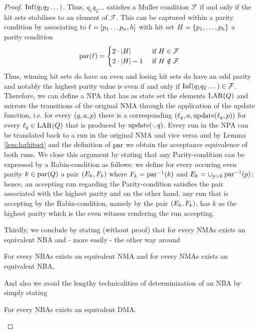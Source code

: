 \begin{proof}
  $\operatorname{Inf}(q_{1}q_{2}\dots)$. Thus, $q_{1}q_{2}\dots$ satisfies a Muller condition
  $\mathcal{F}$ if and only if the hit sets stabilises to an element of
  $\mathcal{F}$. This can be captured within a parity condition by associating
  to $\ell = \left[p_{1}\dots p_{n},h\right]$ with hit set
  $H = \left\{p_{1},\dots,p_{h}\right\}$ a parity condition
  \begin{equation*}
    \operatorname{par}(\ell) = \begin{cases}
      2\cdot\left\vert{H}\right\vert &\text{ if }H\in\mathcal{F}\\
      2\cdot\left\vert{H}\right\vert-1 &\text{ if }H\notin\mathcal{F}
    \end{cases}
  \end{equation*}
  Thus, winning hit sets do have an even and losing hit sets do have an odd
  parity and notably the highest parity value is even if and only if
  $\operatorname{Inf}(q_{1}q_{2}\dots)\in\mathcal{F}$. Therefore, we can define a \ac{NPA}
  that has as state set the elements $\operatorname{LAR}(Q)$ and mirrors the transitions of
  the original \ac{NMA} through the application of the update function, i.e.
  for every $\left(q, a, p\right)$ there is a corresponding 
  $\left(\ell_{q}, a, \operatorname{update}(\ell_{q}, p)\right)$ for every $\ell_{q}\in\operatorname{LAR}(Q)$ that
  is produced by $\operatorname{update}(\cdot,q)$. Every run in the \ac{NPA} can be translated 
  back to a run in the original \ac{NMA} and vice versa and by Lemma 
  \ref{lem:larhitset} and the definition of $\operatorname{par}$ we obtain the acceptance
  equivalence of both runs. We close this argument by stating that
  any Parity-condition can be expressed by a Rabin-condition as follows:
  we define for every occuring even parity $k\in\operatorname{par}(Q)$ a pair
  $\left(E_{k}, F_{k}\right)$ where $F_{k} = \operatorname{par}^{-1}(k)$ and
  $E_{k} = \cup_{p>k}\operatorname{par}^{-1}(p)$; hence, an accepting run regarding the
  Parity-condition satisfies the pair associated with the highest parity and
  on the other hand, any run that is accepting by the Rabin-condition, namely
  by the pair $\left(E_{k}, F_{k}\right)$, has  $k$ as the highest parity which is
  the even witness rendering the run accepting.

  Thirdly, we conclude by stating (without proof) that for every \acp{NMA} 
  exists an equivalent \ac{NBA} and - more easily - the other way around
  \begin{theorem}
    \cite[Theorem 1.10]{AutoLogInfGames}
    For every \acp{NBA} exists an equivalent \ac{NMA} and for every \acp{NMA}
    exists an equivalent \ac{NBA}.
  \end{theorem}
  And also we avoid the lengthy technicalities of determinization of an
  \ac{NBA} by simply stating
  \begin{theorem}
    \cite[Theorem 3.6]{AutoLogInfGames}
    For every \acp{NBA} exists an equivalent \ac{DMA}.
  \end{theorem}
\end{proof}
